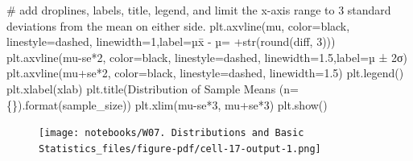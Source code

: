\documentclass[
  letterpaper,
  DIV=11,
  numbers=noendperiod]{scrreprt}
\newenvironment{Shaded}{\begin{snugshade}}{\end{snugshade}}
\newcommand{\BuiltInTok}[1]{\textcolor[rgb]{0.00,0.23,0.31}{#1}}
\newcommand{\CommentTok}[1]{\textcolor[rgb]{0.37,0.37,0.37}{#1}}
\newcommand{\DecValTok}[1]{\textcolor[rgb]{0.68,0.00,0.00}{#1}}
\newcommand{\FloatTok}[1]{\textcolor[rgb]{0.68,0.00,0.00}{#1}}
\newcommand{\NormalTok}[1]{\textcolor[rgb]{0.00,0.23,0.31}{#1}}
\newcommand{\OperatorTok}[1]{\textcolor[rgb]{0.37,0.37,0.37}{#1}}
\newcommand{\SpecialCharTok}[1]{\textcolor[rgb]{0.37,0.37,0.37}{#1}}
\newcommand{\StringTok}[1]{\textcolor[rgb]{0.13,0.47,0.30}{#1}}
\begin{document}
\begin{Shaded}
\begin{Highlighting}[]
    \CommentTok{\# add droplines, labels, title, legend, and limit the x{-}axis range to 3 standard deviations from the mean on either side.}
\NormalTok{    plt.axvline(mu, color}\OperatorTok{=}\StringTok{\textquotesingle{}black\textquotesingle{}}\NormalTok{, linestyle}\OperatorTok{=}\StringTok{\textquotesingle{}dashed\textquotesingle{}}\NormalTok{, linewidth}\OperatorTok{=}\DecValTok{1}\NormalTok{,label}\OperatorTok{=}\StringTok{\textquotesingle{}µx̄ {-} µ= \textquotesingle{}}\OperatorTok{+}\BuiltInTok{str}\NormalTok{(}\BuiltInTok{round}\NormalTok{(diff, }\DecValTok{3}\NormalTok{)))}
\NormalTok{    plt.axvline(mu}\OperatorTok{{-}}\NormalTok{se}\OperatorTok{*}\DecValTok{2}\NormalTok{, color}\OperatorTok{=}\StringTok{\textquotesingle{}black\textquotesingle{}}\NormalTok{, linestyle}\OperatorTok{=}\StringTok{\textquotesingle{}dashed\textquotesingle{}}\NormalTok{, linewidth}\OperatorTok{=}\FloatTok{1.5}\NormalTok{,label}\OperatorTok{=}\StringTok{\textquotesingle{}µ ± 2σ\textquotesingle{}}\NormalTok{)}
\NormalTok{    plt.axvline(mu}\OperatorTok{+}\NormalTok{se}\OperatorTok{*}\DecValTok{2}\NormalTok{, color}\OperatorTok{=}\StringTok{\textquotesingle{}black\textquotesingle{}}\NormalTok{, linestyle}\OperatorTok{=}\StringTok{\textquotesingle{}dashed\textquotesingle{}}\NormalTok{, linewidth}\OperatorTok{=}\FloatTok{1.5}\NormalTok{)}
\NormalTok{    plt.legend()}
\NormalTok{    plt.xlabel(xlab)    }
\NormalTok{    plt.title(}\StringTok{\textquotesingle{}Distribution of Sample Means (n=}\SpecialCharTok{\{\}}\StringTok{)\textquotesingle{}}\NormalTok{.}\BuiltInTok{format}\NormalTok{(sample\_size))}
\NormalTok{    plt.xlim(mu}\OperatorTok{{-}}\NormalTok{se}\OperatorTok{*}\DecValTok{3}\NormalTok{, mu}\OperatorTok{+}\NormalTok{se}\OperatorTok{*}\DecValTok{3}\NormalTok{)}
\NormalTok{    plt.show()  }
\end{Highlighting}
\end{Shaded}

\begin{Shaded}
\end{Shaded}

\begin{figure}[H]

{\centering \texttt{[image: notebooks/W07. Distributions and Basic Statistics\_files/figure-pdf/cell-17-output-1.png]}

}

\end{figure}
\end{document}
